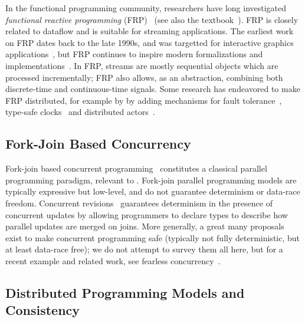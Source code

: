 In the functional programming community, researchers have long investigated
\emph{functional reactive programming} (FRP)~\cite{wan2000functional,nilsson2002functional} (see also the textbook~\cite{blackheath2016functional}).
FRP is closely related to dataflow and is suitable for streaming applications.
The earliest work on FRP dates back to the late 1990s, and was targetted for interactive graphics applications~\cite{elliott1997functional,elliott1997modeling},
but FRP continues to inspire modern formalizations and implementations~\cite{perez2016functional}.
In FRP, streams are mostly sequential objects which are processed incrementally; FRP also allows, as an abstraction, combining both discrete-time and continuous-time signals.
Some research has endeavored to make FRP distributed,
for example by by adding mechanisms for
fault tolerance~\cite{perez2020fault},
type-safe clocks~\cite{barenz2018rhine}
and distributed actors~\cite{shibanai2018distributed}.

\subsection{Fork-Join Based Concurrency}

Fork-join based
concurrent programming~\cite{frigo1998implementation,lea2000java}
constitutes a classical parallel programming paradigm,
relevant to .
Fork-join parallel programming models are typically expressive but low-level, and do not guarantee determinism or data-race freedom.
Concurrent revisions~\cite{burckhardt2010concurrent}
guarantees determinism in the presence of concurrent updates
by allowing programmers to declare types to describe how parallel updates are merged on joins.
More generally, a great many proposals exist to make concurrent programming safe (typically not fully deterministic, but at least data-race free);
we do not attempt to survey them all here,
but for a recent example and related work, see fearless concurrency~\cite{milano2022flexible}.

\subsection{Distributed Programming Models and Consistency}

